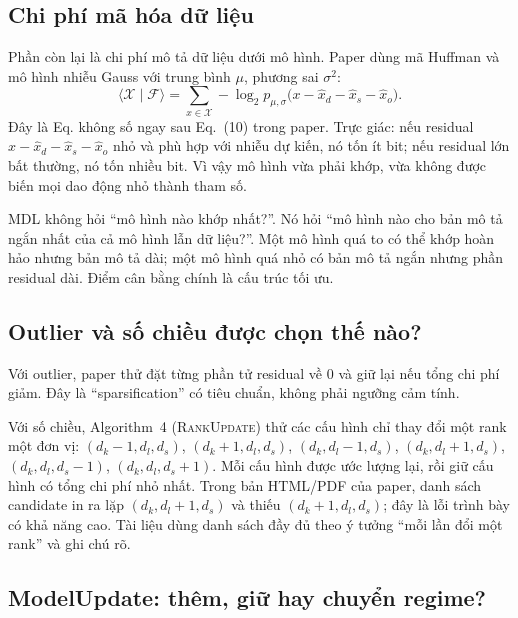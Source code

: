 \subsection{Chi phí mã hóa dữ liệu}

Phần còn lại là chi phí mô tả dữ liệu dưới mô hình. Paper dùng mã Huffman và mô hình nhiễu Gauss
với trung bình $\mu$, phương sai $\sigma^2$:
\begin{equation}
  \bigl\langle\mathcal{X}\mid\mathcal{F}\bigr\rangle
  =\sum_{x\in\mathcal{X}}
   -\log_2 p_{\mu,\sigma}
   \bigl(x-\widehat{x}_d-\widehat{x}_s-\widehat{x}_o\bigr).
  \label{eq:data-cost}
\end{equation}
Đây là Eq. không số ngay sau Eq.~(10) trong paper. Trực giác: nếu residual
$x-\widehat{x}_d-\widehat{x}_s-\widehat{x}_o$ nhỏ và phù hợp với nhiễu dự kiến, nó tốn ít bit;
nếu residual lớn bất thường, nó tốn nhiều bit. Vì vậy mô hình vừa phải khớp, vừa không được biến
mọi dao động nhỏ thành tham số.

\begin{plainwords}
MDL không hỏi ``mô hình nào khớp nhất?''. Nó hỏi ``mô hình nào cho bản mô tả ngắn nhất của cả mô
hình lẫn dữ liệu?''. Một mô hình quá to có thể khớp hoàn hảo nhưng bản mô tả dài; một mô hình quá
nhỏ có bản mô tả ngắn nhưng phần residual dài. Điểm cân bằng chính là cấu trúc tối ưu.
\end{plainwords}

\subsection{Outlier và số chiều được chọn thế nào?}

Với outlier, paper thử đặt từng phần tử residual về 0 và giữ lại nếu tổng chi phí giảm. Đây là
``sparsification'' có tiêu chuẩn, không phải ngưỡng cảm tính.

Với số chiều, Algorithm~4 (\textsc{RankUpdate}) thử các cấu hình chỉ thay đổi một rank một đơn vị:
$(d_k-1,d_l,d_s)$, $(d_k+1,d_l,d_s)$, $(d_k,d_l-1,d_s)$, $(d_k,d_l+1,d_s)$,
$(d_k,d_l,d_s-1)$, $(d_k,d_l,d_s+1)$. Mỗi cấu hình được ước lượng lại, rồi giữ cấu hình có tổng
chi phí nhỏ nhất. Trong bản HTML/PDF của paper, danh sách candidate in ra lặp
$(d_k,d_l+1,d_s)$ và thiếu $(d_k+1,d_l,d_s)$; đây là lỗi trình bày có khả năng cao. Tài liệu dùng
danh sách đầy đủ theo ý tưởng ``mỗi lần đổi một rank'' và ghi chú rõ.

\subsection{ModelUpdate: thêm, giữ hay chuyển regime?}


